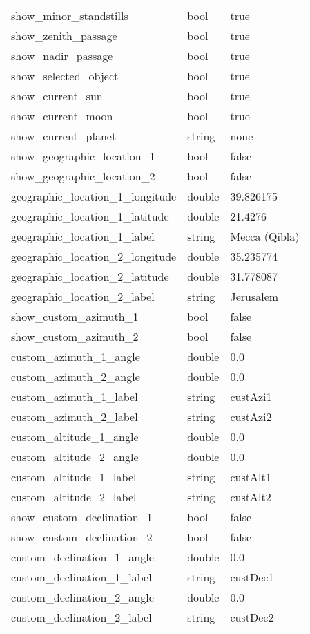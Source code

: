 \begin{longtable}{l|l|l}
show\_minor\_standstills       &bool        & true  \\
show\_zenith\_passage          &bool        & true  \\
show\_nadir\_passage           &bool        & true  \\
show\_selected\_object         &bool        & true  \\
show\_current\_sun             &bool        & true  \\
show\_current\_moon            &bool        & true  \\
show\_current\_planet          &string      & none  \\\midrule
show\_geographic\_location\_1  &bool        & false         \\
show\_geographic\_location\_2  &bool        & false         \\
geographic\_location\_1\_longitude &double  & 39.826175     \\
geographic\_location\_1\_latitude  &double  & 21.4276       \\
geographic\_location\_1\_label     &string  & Mecca (Qibla) \\
geographic\_location\_2\_longitude &double  & 35.235774     \\
geographic\_location\_2\_latitude  &double  & 31.778087     \\
geographic\_location\_2\_label     &string  & Jerusalem     \\\midrule
show\_custom\_azimuth\_1       &bool        & false    \\
show\_custom\_azimuth\_2       &bool        & false    \\
custom\_azimuth\_1\_angle      &double      & 0.0      \\
custom\_azimuth\_2\_angle      &double      & 0.0      \\
custom\_azimuth\_1\_label      &string      & custAzi1 \\
custom\_azimuth\_2\_label      &string      & custAzi2 \\
custom\_altitude\_1\_angle     &double      & 0.0      \\
custom\_altitude\_2\_angle     &double      & 0.0      \\
custom\_altitude\_1\_label     &string      & custAlt1 \\
custom\_altitude\_2\_label     &string      & custAlt2 \\\midrule
show\_custom\_declination\_1   &bool        & false    \\
show\_custom\_declination\_2   &bool        & false    \\
custom\_declination\_1\_angle  &double      & 0.0      \\
custom\_declination\_1\_label  &string      & custDec1 \\
custom\_declination\_2\_angle  &double      & 0.0      \\
custom\_declination\_2\_label  &string      & custDec2 \\\bottomrule
\end{longtable}

